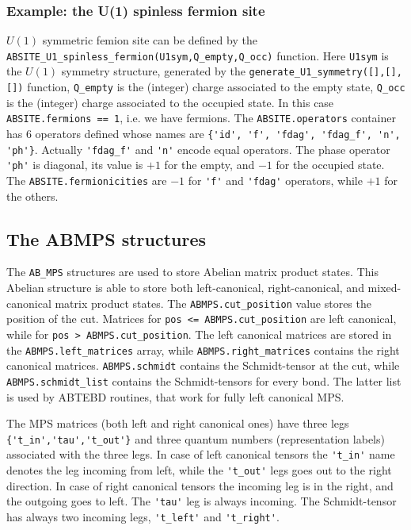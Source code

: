 \documentclass[aps,prb,twocolumn,showpacs,preprintnumbers,amsmath,amssymb, superscriptaddressm, nofootinbib]{revtex4-2}   %
\begin{document}
\subsubsection{Example: the U(1) spinless fermion site}
$U(1)$ symmetric femion site can be defined by the \verb|ABSITE_U1_spinless_fermion(U1sym,Q_empty,Q_occ)| function. Here \verb|U1sym| is the $U(1)$ symmetry structure, generated by the \verb|generate_U1_symmetry([],[],[])| function, \verb|Q_empty| is the (integer) charge associated to the empty state, \verb|Q_occ| is the (integer) charge associated to the occupied state. In this case \verb|ABSITE.fermions == 1|, i.e. we have fermions. The \verb|ABSITE.operators| container has 6 operators defined whose names are \verb|{'id', 'f', 'fdag', 'fdag_f', 'n', 'ph'}|. Actually \verb|'fdag_f'| and \verb|'n'| encode equal operators. The phase operator \verb|'ph'| is diagonal, its value is $+1$ for the empty, and $-1$ for the occupied state. The \verb|ABSITE.fermionicities| are $-1$ for \verb|'f'| and \verb|'fdag'| operators, while $+1$ for the others.


\subsection{The ABMPS structures}
The \verb|AB_MPS| structures are used to store Abelian matrix product states. This Abelian structure is able to store both left-canonical, right-canonical, and mixed-canonical matrix product states. The \verb|ABMPS.cut_position| value stores the position of the cut. Matrices for \verb|pos <= ABMPS.cut_position| are left canonical, while for \verb|pos > ABMPS.cut_position|. The left canonical matrices are stored in the \verb|ABMPS.left_matrices| array, while \verb|ABMPS.right_matrices| contains the right canonical matrices. \verb|ABMPS.schmidt| contains the Schmidt-tensor at the cut, while \verb|ABMPS.schmidt_list| contains the Schmidt-tensors for every bond. The latter list is used by ABTEBD routines, that work for fully left canonical MPS.

The MPS matrices (both left and right canonical ones) have three legs \verb|{'t_in','tau','t_out'}| and three quantum numbers (representation labels) associated with the three legs. In case of left canonical tensors the \verb|'t_in'| name denotes the leg incoming from left, while the \verb|'t_out'| legs goes out to the right direction. In case of right canonical tensors the incoming leg is in the right, and the outgoing goes to left. The \verb|'tau'| leg is always incoming. The Schmidt-tensor has always two incoming legs, \verb|'t_left'| and \verb|'t_right'|.
\end{document}
